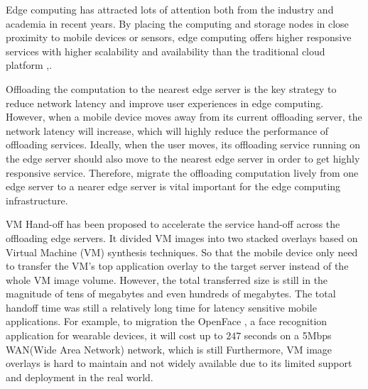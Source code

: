 
Edge computing has attracted lots of attention both from the industry and academia in recent years\cite{satya2009case,  MEC2014initiative, MEC2015-5G, yi2015fog,yi2015survey, satya2017edge}.
By placing the computing and storage nodes in close proximity to mobile devices or sensors, edge computing offers higher responsive services with higher scalability and availability than the traditional cloud platform \cite{MEC2014initiative},\cite{satya2017edge}.

Offloading the computation to the nearest edge server is the key strategy to reduce network latency and improve user experiences in edge computing. 
However, when a mobile device moves away from its current offloading server, the network latency will increase, which will highly reduce the performance of offloading services. Ideally, when the user moves, its offloading service running on the edge server should also move to the nearest edge server in order to get highly responsive service. Therefore, migrate the offloading computation lively from one edge server to a nearer edge server is vital important for the edge computing infrastructure. 

VM Hand-off \cite{ha2015vmhandoff} has been proposed to accelerate the service hand-off across the offloading edge servers. It divided VM images into two stacked overlays based on Virtual Machine (VM) synthesis \cite{satya2009case} techniques. So that the mobile device only need to transfer the VM's top application overlay to the target server instead of the whole VM image volume. However, the total transferred size is still in the magnitude of tens of megabytes and even hundreds of megabytes. The total handoff time was still a relatively long time for latency sensitive mobile applications. For example, to migration the OpenFace \cite{openface2016}, a face recognition application for wearable devices, it will cost up to $247$ seconds on a 5Mbps WAN(Wide Area Network) network, which is still Furthermore, VM image overlays is hard to maintain and not widely available due to its limited support and deployment in the real world.

